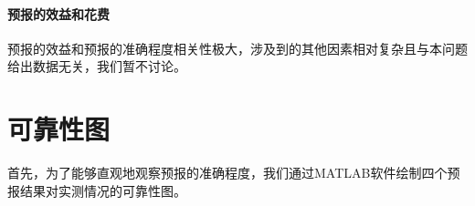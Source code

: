 \documentclass[a4paper,12pt,onecolumn,twoside]{article}
\begin{document}
\paragraph{预报的效益和花费}
预报的效益和预报的准确程度相关性极大，涉及到的其他因素相对复杂且与本问题给出数据无关，我们暂不讨论。\par
\section{可靠性图}
首先，为了能够直观地观察预报的准确程度，我们通过MATLAB软件绘制四个预报结果对实测情况的可靠性图。
\begin{figure}[H]
	\centering
	\quad
\end{figure}
\end{document}
